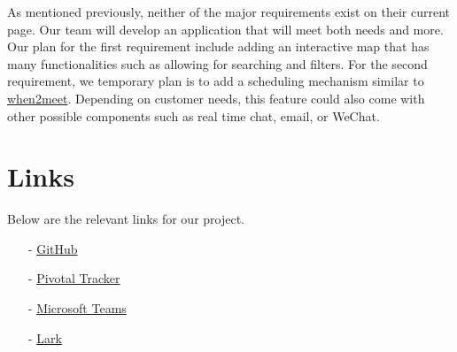 \documentclass{article}
\begin{document}
\noindent As mentioned previously, neither of the major requirements exist on their current page. Our team will develop an application that will meet both needs and more. Our plan for the first requirement include adding an interactive map that has many functionalities such as allowing for searching and filters. For the second requirement, we temporary plan is to add a scheduling mechanism similar to \href{https://www.when2meet.com/}{when2meet}. Depending on customer needs, this feature could also come with other possible components such as real time chat, email, or WeChat.

\section{Links}
Below are the relevant links for our project.
\begin{itemize}
    \item[-]
        \href{https://github.tamu.edu/hyu/jjleasegroup}{GitHub}
    \item[-]
        \href{https://www.pivotaltracker.com/projects/2595494}{Pivotal Tracker}
    \item[-]
        \href{https://teams.microsoft.com/l/team/19%3aXWjtCUqGt6RxXxkIr3OSatS0eA3LvTel_hHg7H4RVWU1%40thread.tacv2/conversations?groupId=3f3b5b0c-fd70-4614-8136-268b05825fac&tenantId=68f381e3-46da-47b9-ba57-6f322b8f0da1}{Microsoft Teams}

    \item[-]
        \href{https://x9shpyf80h.larksuite.com/drive/folder/fldusCrHhDEsuBDbmFOMmDk8PGI}{Lark}
\end{itemize}
\end{document}
